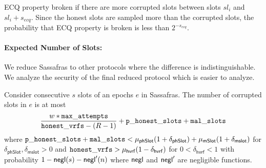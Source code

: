 ECQ property broken if there are more corrupted slots between slots $ sl_i $ and $ sl_i + s_{ecq} $.  Since the honest slots are sampled more than the corrupted slots,  the probability that ECQ property is broken is less than $ 2^{-s_{ecq}} $.





%
%
%
%
%
%
%
%


\paragraph{Expected Number of Slots:}


We reduce Sassafras to other protocols where the difference is indistinguishable. We analyze the security of the final reduced protocol which is easier to analyze.

\begin{theorem}
	Consider consecutive $ s $ slots of an epochs $ e $  in Sassafras. The number of corrupted slots in $ e $ is at most
	$$ \frac{w *\mathtt{max\_attempts}}{\mathtt{honest\_vrfs} - (R-1)} +  \mathtt{p\_honest\_slots} + \mathtt{mal\_slots} $$ 
	 where $ \mathtt{p\_honest\_slots} + \mathtt{mal\_slots} < \mu_{\mathsf{phSlot}}(1+\delta_{\mathsf{phSlot}}) + \mu_{\mathsf{mSlot}} (1 + \delta_{\mathsf{mslot}}) $ for  $ \delta_{\mathsf{phSlot}}, \delta_{\mathsf{mslot}} > 0 $ and $ \mathtt{honest\_vrfs} > \mu_{\mathsf{hvrf}} (1- \delta_{\mathsf{hvrf}}) $ for $ 0<\delta_{\mathsf{hvrf}} <1 $ with probability $ 1- \mathsf{negl}(s) - \mathsf{negl}'(n) $ where $ \mathsf{negl} $ and $\mathsf{negl}'  $ are  negligible functions.
\end{theorem}

